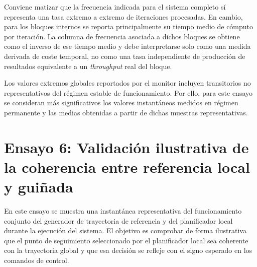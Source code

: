 Conviene matizar que la frecuencia indicada para el sistema completo s\'i representa una tasa extremo a extremo de iteraciones 
procesadas. En cambio, para los bloques internos se reporta principalmente su tiempo medio de c\'omputo por iteraci\'on. La columna 
de frecuencia asociada a dichos bloques se obtiene como el inverso de ese tiempo medio y debe interpretarse solo como una medida 
derivada de coste temporal, no como una tasa independiente de producci\'on de resultados equivalente a un \textit{throughput} real del bloque.

Los valores extremos globales reportados por el monitor incluyen transitorios no representativos del r\'egimen estable de 
funcionamiento. Por ello, para este ensayo se consideran m\'as significativos los valores instant\'aneos medidos en r\'egimen 
permanente y las medias obtenidas a partir de dichas muestras representativas.


\begin{table}[H]
    \centering
    \caption{Resumen de tiempos medios de bloque y frecuencia extremo a extremo del Ensayo 5.}
    \label{tab:test5_frequencies}
    \small
\end{table}

\section{Ensayo 6: Validaci\'on ilustrativa de la coherencia entre referencia local y gui\~nada}
En este ensayo se muestra una instant\'anea representativa del funcionamiento conjunto del generador de trayectoria de referencia y del planificador local durante la 
ejecuci\'on del sistema. El objetivo es comprobar de forma ilustrativa que el punto de seguimiento seleccionado por el planificador local sea 
coherente con la trayectoria global y que esa decisi\'on se refleje con el signo esperado en los comandos de control.


